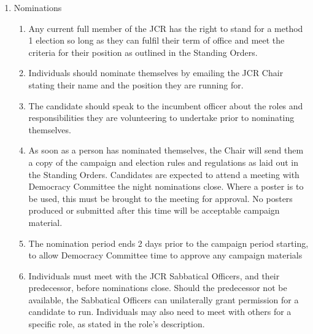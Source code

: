 \label{Method 1 Campaign Regulations}
\begin{enumerate}
    \item Nominations
    \begin{enumerate}
        \item Any current full member of the JCR has the right to stand for a method 1 election so long as they can fulfil their term of office and meet the criteria for their position as outlined in the Standing Orders.
        \item Individuals should nominate themselves by emailing the JCR Chair stating their name and the position they are running for.
        \item The candidate should speak to the incumbent officer about the roles and responsibilities they are volunteering to undertake prior to nominating themselves.
        \item As soon as a person has nominated themselves, the Chair will send them a copy of the campaign and election rules and regulations as laid out in the Standing Orders. Candidates are expected to attend a meeting with Democracy Committee the night nominations close. Where a poster is to be used, this must be brought to the meeting for approval. No posters produced or submitted after this time will be acceptable campaign material.
        \item The nomination period ends 2 days prior to the campaign period starting, to allow Democracy Committee time to approve any campaign materials
        \item Individuals must meet with the JCR Sabbatical Officers, and their predecessor, before nominations close. Should the predecessor not be available, the Sabbatical Officers can unilaterally grant permission for a candidate to run. Individuals may also need to meet with others for a specific role, as stated in the role's description.
        

\end{enumerate}
\end{enumerate}
